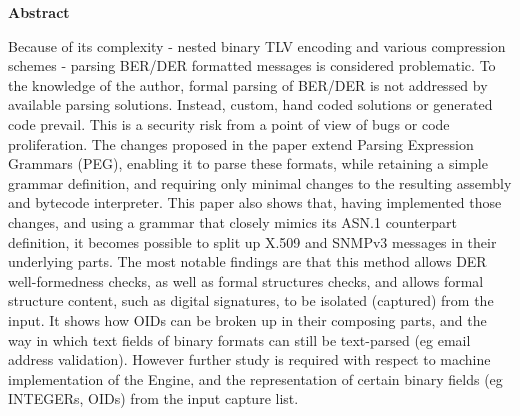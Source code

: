 \textbf{Abstract}

Because of its complexity - nested binary TLV encoding and various
compression schemes -
parsing BER/DER formatted messages is considered problematic. To the
knowledge of the author, formal parsing of BER/DER is not
addressed by available parsing solutions. Instead, custom, hand
coded solutions or generated code prevail. This is a security risk from a
point of view of bugs or code proliferation. The changes proposed in the
paper extend Parsing Expression Grammars
(PEG), enabling it to parse these formats, while retaining a
simple grammar definition, and requiring only minimal changes to the
resulting assembly and bytecode interpreter. This paper also shows that, having
implemented those changes, and using a grammar that closely mimics its
ASN.1 counterpart definition, it becomes possible to split up X.509 and SNMPv3
messages in their underlying parts. The most notable findings are that
this method allows DER well-formedness checks, as well as formal
structures checks, and allows formal structure content, such as digital
signatures, to be isolated (captured) from the input. It shows how OIDs
can be broken up in their composing parts, and the way in which text
fields of binary formats can still be text-parsed (eg email address
validation). However further study is required with respect to machine
implementation of the Engine, and the representation of certain binary
fields (eg INTEGERs, OIDs) from the input capture list.

